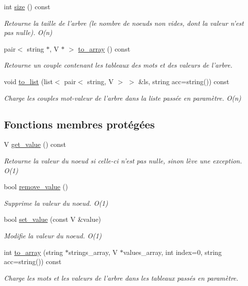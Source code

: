 \begin{DoxyCompactItemize}
int \hyperlink{classnode_a846ea47a943b86fe4ac83b49c3eff812}{size} () const 
\begin{DoxyCompactList}\small\item\em Retourne la taille de l'arbre (le nombre de noeuds non vides, dont la valeur n'est pas nulle). O(n) \end{DoxyCompactList}\item 
pair$<$ string $\ast$, V $\ast$ $>$ \hyperlink{classnode_ae03f7d30d5f6790a8b728fbcd22ddc7a}{to\-\_\-array} () const 
\begin{DoxyCompactList}\small\item\em Retourne un couple contenant les tableaux des mots et des valeurs de l'arbre. \end{DoxyCompactList}\item 
void \hyperlink{classnode_a987aaf4ac3f24c00e33ff1532cf48dbf}{to\-\_\-list} (list$<$ pair$<$ string, V $>$ $>$ \&ls, string acc=string()) const 
\begin{DoxyCompactList}\small\item\em Charge les couples mot-\/valeur de l'arbre dans la liste passée en paramètre. O(n) \end{DoxyCompactList}\end{DoxyCompactItemize}
\subsection*{Fonctions membres protégées}
\begin{DoxyCompactItemize}
\item 
V \hyperlink{classnode_aacbd2cac63c1c594c64e8e14c6afd7d4}{get\-\_\-value} () const 
\begin{DoxyCompactList}\small\item\em Retourne la valeur du noeud si celle-\/ci n'est pas nulle, sinon lève une exception. O(1) \end{DoxyCompactList}\item 
bool \hyperlink{classnode_a79dc843ca4834349a8ffb73b80bcf3da}{remove\-\_\-value} ()
\begin{DoxyCompactList}\small\item\em Supprime la valeur du noeud. O(1) \end{DoxyCompactList}\item 
bool \hyperlink{classnode_a8fbcee4dafe59849c9099ed30324b295}{set\-\_\-value} (const V \&value)
\begin{DoxyCompactList}\small\item\em Modifie la valeur du noeud. O(1) \end{DoxyCompactList}\item 
int \hyperlink{classnode_a368290a79b566ba030967b15bf432a59}{to\-\_\-array} (string $\ast$strings\-\_\-array, V $\ast$values\-\_\-array, int index=0, string acc=string()) const 
\begin{DoxyCompactList}\small\item\em Charge les mots et les valeurs de l'arbre dans les tableaux passés en paramètre. \end{DoxyCompactList}\end{DoxyCompactItemize}
